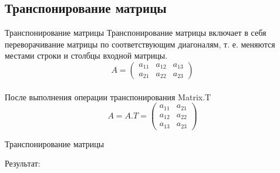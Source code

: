 \documentclass[12pt]{beamer}
\begin{document}
\subsection{Транспонирование матрицы}
\begin{frame}{Транспонирование матрицы}
Транспонирование матрицы включает в себя переворачивание матрицы по соответствующим диагоналям, т. е. меняются местами строки и столбцы входной матрицы.
\vspace{0.5cm}
\[
  A = 
  \begin{pmatrix}
    a_{11} & a_{12} & a_{13} \\
    a_{21} & a_{22} & a_{23}
  \end{pmatrix} 
\]
\\
После выполнения операции транспонирования Matrix.T
\\
\[
  A = A.T = 
  \begin{pmatrix}
    a_{11} & a_{21} \\
    a_{12} & a_{22} \\
    a_{13} & a_{23} 
  \end{pmatrix}
\]
\end{frame}


\begin{frame}{Транспонирование матрицы}

Результат: \\

\end{frame}
\end{document}
